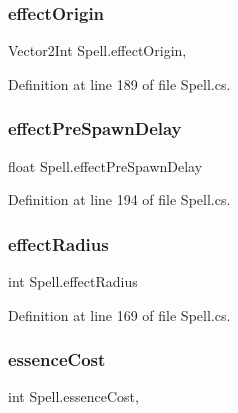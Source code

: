 \subsubsection{\texorpdfstring{effectOrigin}{effectOrigin}}
{\footnotesize\ttfamily Vector2\+Int Spell.\+effect\+Origin\hspace{0.3cm}{\ttfamily [get]}, {\ttfamily [set]}}



Definition at line 189 of file Spell.\+cs.

\mbox{\label{class_spell_a99825dc703050936c87a7b8b02f3539d}} 
\subsubsection{\texorpdfstring{effectPreSpawnDelay}{effectPreSpawnDelay}}
{\footnotesize\ttfamily float Spell.\+effect\+Pre\+Spawn\+Delay\hspace{0.3cm}{\ttfamily [get]}}



Definition at line 194 of file Spell.\+cs.

\mbox{\label{class_spell_a7af1a010c8b8bff70bba88de6f474c1b}} 
\subsubsection{\texorpdfstring{effectRadius}{effectRadius}}
{\footnotesize\ttfamily int Spell.\+effect\+Radius\hspace{0.3cm}{\ttfamily [get]}}



Definition at line 169 of file Spell.\+cs.

\mbox{\label{class_spell_a213cc910c2cc43b2ac27d4524c90722c}} 
\subsubsection{\texorpdfstring{essenceCost}{essenceCost}}
{\footnotesize\ttfamily int Spell.\+essence\+Cost\hspace{0.3cm}{\ttfamily [get]}, {\ttfamily [set]}}



